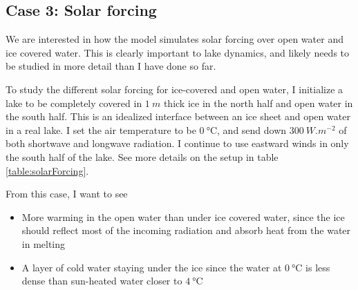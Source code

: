 \documentclass[11pt]{article}
\begin{document}
\subsection{Case 3: Solar forcing}
We are interested in how the model simulates solar forcing over open water and ice covered water. This is clearly important to lake dynamics, and likely needs to be studied in more detail than I have done so far.

To study the different solar forcing for ice-covered and open water, I initialize a lake to be completely covered in $\SI{1}{m}$ thick ice in the north half and open water in the south half. This is an idealized interface between an ice sheet and open water in a real lake. I set the air temperature to be $\SI{0}{\celsius}$, and send down $\SI{300}{W.m^{-2}}$ of both shortwave and longwave radiation. I continue to use eastward winds in only the south half of the lake. See more details on the setup in table \ref{table:solarForcing}.

From this case, I want to see
\begin{itemize}
\item{More warming in the open water than under ice covered water, since the ice should reflect most of the incoming radiation and absorb heat from the water in melting}
\item{A layer of cold water staying under the ice since the water at $\SI{0}{\celsius}$ is less dense than sun-heated water closer to $\SI{4}{\celsius}$}
\end{itemize}
\end{document}
